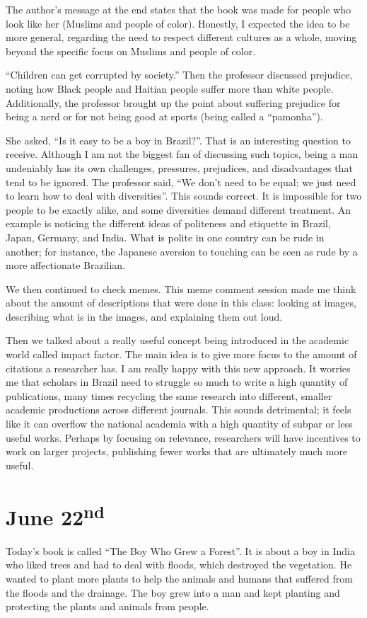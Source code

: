 The author's message at the end states that the book was made for people who look like her (Muslims and people of color). Honestly, I expected the idea to be more general, regarding the need to respect different cultures as a whole, moving beyond the specific focus on Muslims and people of color.

``Children can get corrupted by society.'' Then the professor discussed prejudice, noting how Black people and Haitian people suffer more than white people. Additionally, the professor brought up the point about suffering prejudice for being a nerd or for not being good at sports (being called a ``pamonha'').

She asked, ``Is it easy to be a boy in Brazil?''. That is an interesting question to receive. Although I am not the biggest fan of discussing such topics, being a man undeniably has its own challenges, pressures, prejudices, and disadvantages that tend to be ignored. The professor said, ``We don't need to be equal; we just need to learn how to deal with diversities''. This sounds correct. It is impossible for two people to be exactly alike, and some diversities demand different treatment. An example is noticing the different ideas of politeness and etiquette in Brazil, Japan, Germany, and India. What is polite in one country can be rude in another; for instance, the Japanese aversion to touching can be seen as rude by a more affectionate Brazilian.

We then continued to check memes. This meme comment session made me think about the amount of descriptions that were done in this class: looking at images, describing what is in the images, and explaining them out loud.

Then we talked about a really useful concept being introduced in the academic world called impact factor. The main idea is to give more focus to the amount of citations a researcher has. I am really happy with this new approach. It worries me that scholars in Brazil need to struggle so much to write a high quantity of publications, many times recycling the same research into different, smaller academic productions across different journals. This sounds detrimental; it feels like it can overflow the national academia with a high quantity of subpar or less useful works. Perhaps by focusing on relevance, researchers will have incentives to work on larger projects, publishing fewer works that are ultimately much more useful.


\section[June 22]{June 22\textsuperscript{nd}}
Today's book is called ``The Boy Who Grew a Forest''. It is about a boy in India who liked trees and had to deal with floods, which destroyed the vegetation. He wanted to plant more plants to help the animals and humans that suffered from the floods and the drainage. The boy grew into a man and kept planting and protecting the plants and animals from people.

